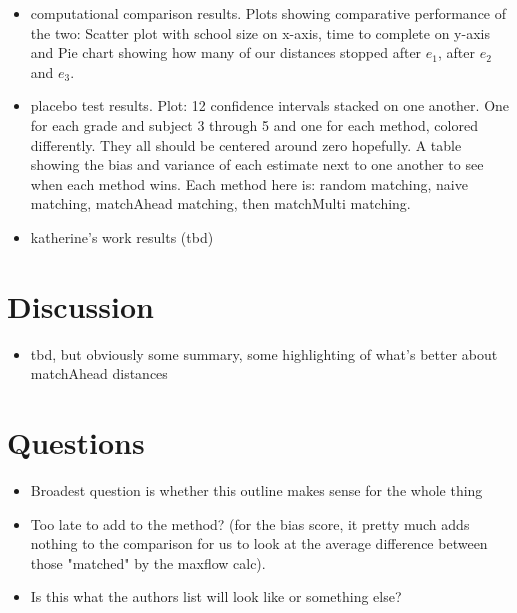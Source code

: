 \documentclass[aoas]{imsart}
\theoremstyle{plain}
\theoremstyle{definition}
\begin{document}
\begin{itemize}
  \item computational comparison results. Plots showing comparative performance of the two: Scatter plot with school size on x-axis, time to complete on y-axis and Pie chart showing how many of our distances stopped after $e_1$, after $e_2$ and $e_3$.
  \item placebo test results. Plot: 12 confidence intervals stacked on one another. One for each grade and subject 3 through 5 and one for each method, colored differently. They all should be centered around zero hopefully. A table showing the bias and variance of each estimate next to one another to see when each method wins. Each method here is: random matching, naive matching, matchAhead matching, then matchMulti matching.
  \item katherine's work results (tbd)
\end{itemize}

\section{Discussion}

\begin{itemize}
  \item tbd, but obviously some summary, some highlighting of what's better about matchAhead distances
\end{itemize}

\section{Questions}
\begin{itemize}
  \item Broadest question is whether this outline makes sense for the whole thing
  \item Too late to add to the method? (for the bias score, it pretty much adds nothing to the comparison for us to look at the average difference between those "matched" by the maxflow calc).
  \item Is this what the authors list will look like or something else?
\end{itemize}
\end{document}
